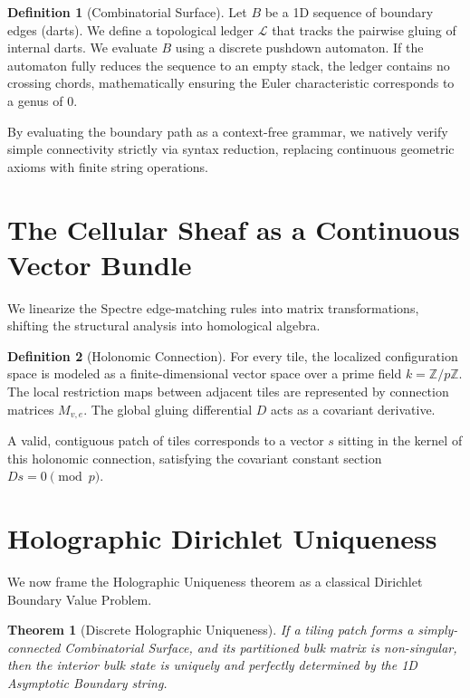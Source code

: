 \documentclass[11pt, letterpaper]{article}
\theoremstyle{definition}
\newtheorem{definition}{Definition}[section]
\theoremstyle{plain}
\newtheorem{theorem}{Theorem}[section]
\begin{document}
\begin{definition}[Combinatorial Surface]
Let $B$ be a 1D sequence of boundary edges (darts). We define a topological ledger $\mathscr{L}$ that tracks the pairwise gluing of internal darts. We evaluate $B$ using a discrete pushdown automaton. If the automaton fully reduces the sequence to an empty stack, the ledger contains no crossing chords, mathematically ensuring the Euler characteristic corresponds to a genus of $0$.
\end{definition}

By evaluating the boundary path as a context-free grammar, we natively verify simple connectivity strictly via syntax reduction, replacing continuous geometric axioms with finite string operations.

\section{The Cellular Sheaf as a Continuous Vector Bundle}
We linearize the Spectre edge-matching rules into matrix transformations, shifting the structural analysis into homological algebra. 

\begin{definition}[Holonomic Connection]
For every tile, the localized configuration space is modeled as a finite-dimensional vector space over a prime field $k = \mathbb{Z}/p\mathbb{Z}$. The local restriction maps between adjacent tiles are represented by connection matrices $M_{v,e}$. The global gluing differential $D$ acts as a covariant derivative.
\end{definition}

A valid, contiguous patch of tiles corresponds to a vector $s$ sitting in the kernel of this holonomic connection, satisfying the covariant constant section $Ds = 0 \pmod p$.

\section{Holographic Dirichlet Uniqueness}
We now frame the Holographic Uniqueness theorem as a classical Dirichlet Boundary Value Problem.

\begin{theorem}[Discrete Holographic Uniqueness]
If a tiling patch forms a simply-connected Combinatorial Surface, and its partitioned bulk matrix is non-singular, then the interior bulk state is uniquely and perfectly determined by the 1D Asymptotic Boundary string.
\end{theorem}
\end{document}
